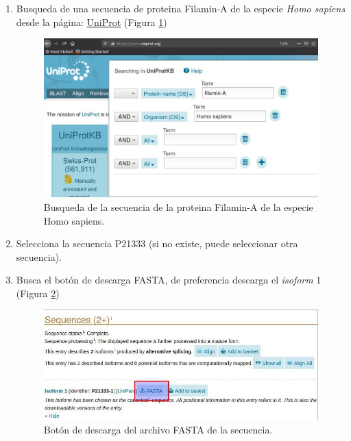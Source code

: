 \documentclass{article}
\begin{document}
\begin{enumerate}
    \item Busqueda de una secuencia de proteina Filamin-A de la especie \textit{Homo sapiens} desde la página: \href{https://www.uniprot.org/}{UniProt}  (Figura \ref{img:uniprot2})
    
    \begin{figure}[h]
     \centering
        \includegraphics[width=\textwidth,height=0.3\textheight,keepaspectratio]{../img/alignment/uniprot2.jpg}
        \caption{Busqueda de la secuencia de la proteina Filamin-A de la especie Homo sapiens.}
         \label{img:uniprot2}
    \end{figure}
    
    \item Selecciona la secuencia  P21333 (si no existe, puede seleccionar otra secuencia).
    \item Busca el botón de descarga FASTA, de preferencia descarga el \textit{isoform} 1 (Figura \ref{img:uniprot4})
    
    \begin{figure}[h]
     \centering
        \includegraphics[width=\textwidth,height=0.2\textheight,keepaspectratio]{../img/alignment/uniprot4.jpg}
        \caption{Botón de descarga del archivo FASTA de la secuencia.}
        \label{img:uniprot4}
    \end{figure}
    

\end{enumerate}
\end{document}

